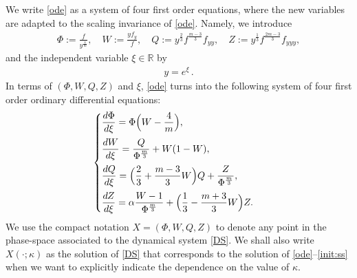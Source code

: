 \documentclass{article}%
\newcommand{\alp}{\alpha}
\begin{document}
We write \eqref{ode} as a system of four first order equations, where the new
variables are adapted to the scaling invariance of \eqref{ode}.  Namely, we
introduce
\begin{align}\label{def-PWZQ}
  \Phi:=\frac{f}{y^{\frac{4}{m}}}, \quad W:=\frac{yf_{y}}{f},\quad Q:=y^{\frac{2}{3}}f^{\frac{m-3}{3}}f_{yy},\quad
  Z:=y^{\frac{1}{3}}f^{\frac{2m-3}{3}}f_{yyy},
\end{align}
and the independent variable $\xi\in\mathbb{R}$ by
\begin{align}\label{def-xi}
  y=e^{\xi}\,.
\end{align}
In terms of $(\Phi,W,Q,Z)$ and $\xi$, \eqref{ode} turns into the following system 
of four first order ordinary differential equations:
\begin{align}
  \begin{cases}
    \displaystyle \frac{d\Phi}{d\xi} = \Phi\Big(W - \frac{ 4}{m}\Big), \vspace{1.2ex} \\
    \displaystyle
    \frac{dW}{d\xi } = \frac{Q}{\Phi^{\frac{m}{3}} }+ W ( 1 - W ), \vspace{1.2ex} \\
    \displaystyle \frac{dQ}{d\xi } = \Big( \frac{2}{3}+\frac{m-3}{3}W \Big) Q + \frac{Z}{\Phi^{\frac{m}{3}}}, \vspace{1.2ex} \\
    \displaystyle \frac{dZ}{d\xi } = \alp \frac{W-1}{\Phi^{\frac{m}{3}}} + \Big(\frac{1}{3} - \frac{m+3}{3} W\Big)Z.
  \end{cases}
  \label{DS}%
\end{align}
We use the compact notation $X=(\Phi,W,Q,Z)$ to denote any point in the
phase-space associated to the dynamical system \eqref{DS}. We shall also write
$X(\cdot;\kappa)$ as the solution of \eqref{DS} that corresponds to the solution
of \eqref{ode}--\eqref{init:ss} when we want to explicitly indicate the
dependence on the value of $\kappa$.

\medskip
\end{document}
